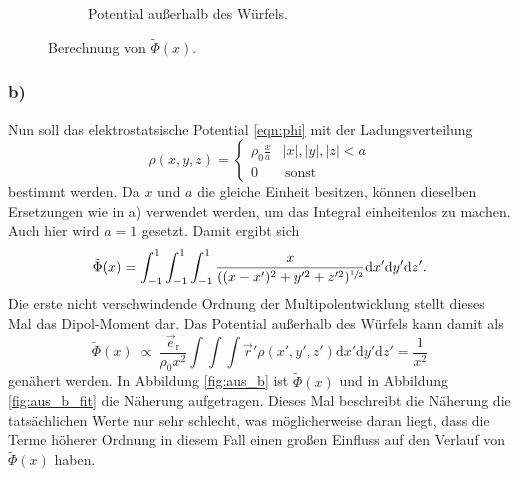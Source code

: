 \begin{figure}
\begin{subfigure}[b]{0.45\textwidth}
      \caption{Potential außerhalb des Würfels.}
      \label{fig:aus_a}
    \end{subfigure}
    \caption{Berechnung von \(\tilde{\Phi}(x)\).}\label{fig:a}
\end{figure}

\subsubsection*{b)}

Nun soll das elektrostatsische Potential \eqref{eqn:phi} mit der Ladungsverteilung
\begin{equation*}
  \rho(x, y, z) = \begin{cases}
  \rho_0 \frac{x}{a} & |x|,|y|,|z| < a \\
  0 &\, \text{sonst}
  \end{cases}
\end{equation*}
bestimmt werden. Da \(x\) und \(a\) die gleiche Einheit besitzen, können dieselben Ersetzungen wie in a) verwendet werden, um das Integral einheitenlos zu machen. Auch hier wird \(a=1\) gesetzt.
Damit ergibt sich
\begin{equation*}
  \tilde{\Phi}(x) = \int_{-1}^1 \int_{-1}^1 \int_{-1}^1 \frac{x}{((x-x')^2+y'^2+z'^2)^{\sfrac{1}{2}}} \mathrm{d}x'\mathrm{d}y'\mathrm{d}z'.
\end{equation*}
Die erste nicht verschwindende Ordnung der Multipolentwicklung stellt dieses Mal das Dipol-Moment dar. Das Potential außerhalb des Würfels kann damit als
\begin{equation*}
  \tilde{\Phi}(x) \: \propto \: \frac{\vec{e}_\text{r}}{\rho_0 x^2} \int \int \int \vec{r}' \rho(x', y', z') \mathrm{d}x'\mathrm{d}y'\mathrm{d}z' = \frac{1}{x^2}
\end{equation*}
genähert werden.
In Abbildung \ref{fig:aus_b} ist \(\tilde{\Phi}(x)\) und in Abbildung \ref{fig:aus_b_fit} die Näherung aufgetragen. Dieses Mal beschreibt die Näherung die tatsächlichen Werte nur sehr schlecht, was möglicherweise daran liegt, dass die Terme höherer Ordnung in diesem Fall einen großen Einfluss auf den Verlauf von \(\tilde{\Phi}(x)\) haben.
